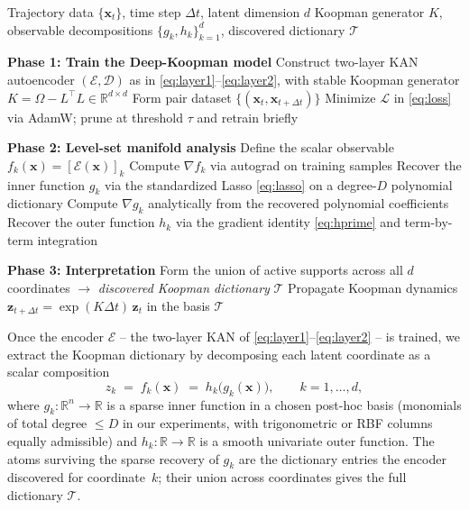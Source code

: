 \documentclass{article}
\newcommand{\R}{\mathbb{R}}
\newcommand{\x}{\bm{x}}
\newcommand{\z}{\bm{z}}
\begin{document}
\begin{algorithm}[!htpb]
\caption{Deep-Koopman-KANDy: Interpretable Deep-Koopman via Two-Layer KAN Encoders}
\label{alg:deep-koopman-kandy}
\begin{algorithmic}[1]
\Require Trajectory data $\{\x_t\}$, time step $\Delta t$, latent dimension $d$
\Ensure Koopman generator $K$, observable decompositions
  $\{g_k, h_k\}_{k=1}^d$, discovered dictionary $\mathcal{T}$

\State \textbf{Phase 1: Train the Deep-Koopman model}
\State Construct two-layer KAN autoencoder $(\mathcal{E},\mathcal{D})$ as in
  \eqref{eq:layer1}--\eqref{eq:layer2}, with stable Koopman generator
  $K = \Omega - L^\top L \in \R^{d\times d}$
\State Form pair dataset $\{(\x_t,\x_{t+\Delta t})\}$
\State Minimize $\mathcal{L}$ in \eqref{eq:loss} via AdamW; prune at threshold
  $\tau$ and retrain briefly

\State
\State \textbf{Phase 2: Level-set manifold analysis}
  \State Define the scalar observable $f_k(\x) = [\mathcal{E}(\x)]_k$
  \State Compute $\nabla f_k$ via autograd on training samples
  \State Recover the inner function $g_k$ via the standardized Lasso
    \eqref{eq:lasso} on a degree-$D$ polynomial dictionary
  \State Compute $\nabla g_k$ analytically from the recovered polynomial
    coefficients
  \State Recover the outer function $h_k$ via the gradient identity
    \eqref{eq:hprime} and term-by-term integration
\EndFor

\State
\State \textbf{Phase 3: Interpretation}
\State Form the union of active supports across all $d$ coordinates
  $\to$ \emph{discovered Koopman dictionary} $\mathcal{T}$
\State Propagate Koopman dynamics $\z_{t+\Delta t} = \exp(K\Delta t)\,\z_t$
  in the basis $\mathcal{T}$
\end{algorithmic}
\end{algorithm}

Once the encoder $\mathcal{E}$ -- the two-layer KAN of
\eqref{eq:layer1}--\eqref{eq:layer2} -- is trained, we extract the Koopman
dictionary by decomposing each latent coordinate as a scalar composition
\begin{equation}\label{eq:hog}
   z_k \;=\; f_k(\x) \;=\; h_k\!\bigl(g_k(\x)\bigr),\qquad k=1,\dots,d,
\end{equation}
where $g_k:\R^n\to\R$ is a sparse inner function in a chosen post-hoc basis
(monomials of total degree $\le D$ in our experiments, with trigonometric or
RBF columns equally admissible) and $h_k:\R\to\R$ is a smooth univariate
outer function. The atoms surviving the sparse recovery of $g_k$ are the
dictionary entries the encoder discovered for coordinate~$k$; their union
across coordinates gives the full dictionary $\mathcal{T}$.
\end{document}
